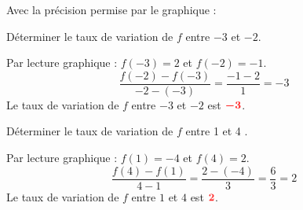 \documentclass[11pt,a4paper]{article}  %
\begin{document}
	Avec la précision permise par le graphique :
	
	\begin{enumMet}
		\item {} Déterminer le taux de variation de $f$ entre $-3$ et $-2$.
		
		\begin{corrBox}
			Par lecture graphique : $f(-3)=2$ \quad {} et $f(-2)=-1$. \quad {}
			\[\dfrac{f(-2)-f(-3)}{-2-(-3)}=\dfrac{-1-2}{1}=-3\]
			Le taux de variation de $f$ entre $-3$ et $-2$ est $\mRouge{-3}$. \quad {}
		\end{corrBox}
		
		\item Déterminer le taux de variation de $f$ entre 1 et 4 .
		
		\begin{corrBox}
			Par lecture graphique : $f(1)=-4$ \quad {} et $f(4)=2$. \quad \bareme{0,5}
			\[\dfrac{f(4)-f(1)}{4-1}=\dfrac{2-(-4)}{3}=\dfrac{6}{3}=2\]
			Le taux de variation de $f$ entre $1$ et $4$ est $\mRouge{2}$. \quad \bareme{0,5}
		\end{corrBox}
	\end{enumMet}
	
\end{document}
